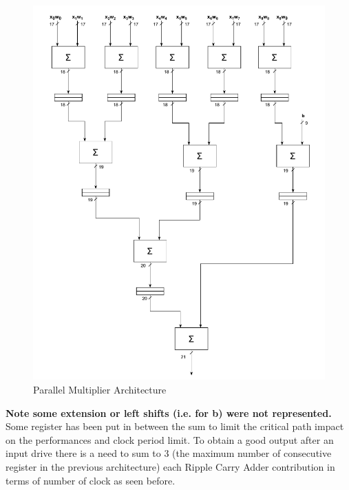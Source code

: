 \begin{figure}[H]
	\centering
	\includegraphics[width=\textwidth]{img/architecture_adder_tree.pdf}
	\caption{Parallel Multiplier Architecture}
\end{figure}

\textbf{Note some extension or left shifts (i.e. for b) were not represented.}\\
Some register has been put in between the sum to limit the critical path impact on the performances and clock period limit. 
To obtain a good output after an input drive there is a need to sum to 3 (the maximum number of consecutive register in the previous architecture) each Ripple Carry Adder contribution in terms of number of clock as seen before.

